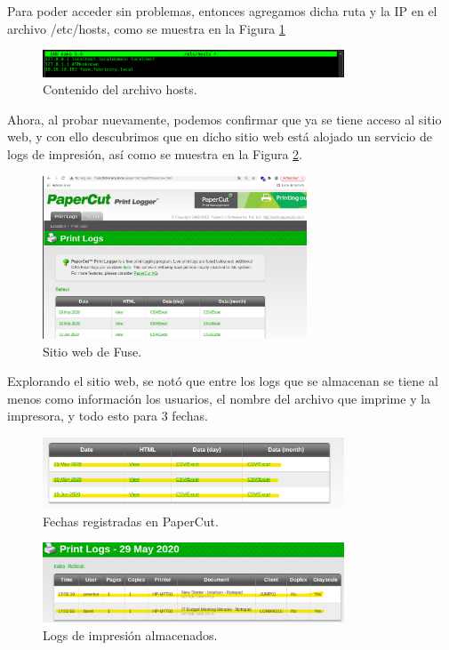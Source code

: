 \documentclass{article}
\begin{document}
Para poder acceder sin problemas, entonces agregamos dicha ruta y la IP en el archivo /etc/hosts, como se muestra en la Figura \ref{fuse_hosts}

\begin{figure}[h]
	\center
	\includegraphics[width=0.8\textwidth]{images/fuse/image3.png}
	\caption{Contenido del archivo hosts.}
	\label{fuse_hosts}
\end{figure}

Ahora, al probar nuevamente, podemos confirmar que ya se tiene acceso al sitio web, y con ello descubrimos que en dicho sitio web está alojado un servicio de logs de impresión, así como se muestra en la Figura \ref{fuse_webpage}.

\begin{figure}[h]
	\center
	\includegraphics[width=0.7\textwidth]{images/fuse/image4.png}
	\caption{Sitio web de Fuse.}
	\label{fuse_webpage}
\end{figure}

\clearpage

Explorando el sitio web, se notó que entre los logs que se almacenan se tiene al menos como información los usuarios, el nombre del archivo que imprime y la impresora, y todo esto para 3 fechas.

\begin{figure}[h]
	\center
	\includegraphics[width=0.8\textwidth]{images/fuse/image5.png}
	\caption{Fechas registradas en PaperCut.}
\end{figure}
\vfill
\begin{figure}[h]
	\center
	\includegraphics[width=0.8\textwidth]{images/fuse/image6.png}
	\caption{Logs de impresión almacenados.}
\end{figure}
\end{document}

